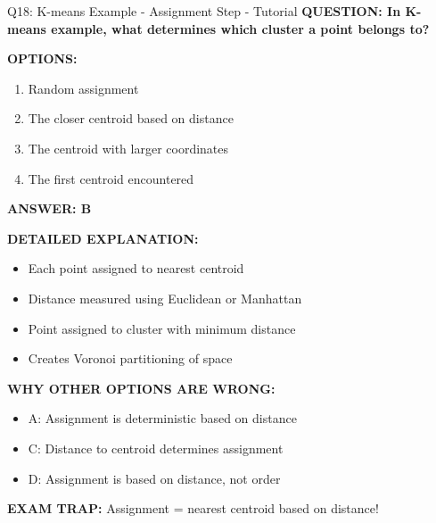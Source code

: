 \documentclass[8pt]{beamer}
\begin{document}
	\begin{frame}{Q18: K-means Example - Assignment Step - Tutorial}
		\fontsize{6.5}{7.5}\selectfont
		\textbf{QUESTION: In K-means example, what determines which cluster a point belongs to?}
		
		\vspace{0.1cm}
		\textbf{OPTIONS:}
		\begin{enumerate}
			\item Random assignment
			\item The closer centroid based on distance
			\item The centroid with larger coordinates
			\item The first centroid encountered
		\end{enumerate}
		
		\vspace{0.1cm}
		\textcolor{myblue}{\textbf{ANSWER: B}}
		
		\vspace{0.1cm}
		\textbf{DETAILED EXPLANATION:}
		\begin{itemize}
			\item Each point assigned to nearest centroid
			\item Distance measured using Euclidean or Manhattan
			\item Point assigned to cluster with minimum distance
			\item Creates Voronoi partitioning of space
		\end{itemize}
		
		\vspace{0.1cm}
		\textcolor{myred}{\textbf{WHY OTHER OPTIONS ARE WRONG:}}
		\begin{itemize}
			\item \textcolor{myred}{A:} Assignment is deterministic based on distance
			\item \textcolor{myred}{C:} Distance to centroid determines assignment
			\item \textcolor{myred}{D:} Assignment is based on distance, not order
		\end{itemize}
		
		\textcolor{myred}{\textbf{EXAM TRAP:}} Assignment = \textcolor{myblue}{nearest centroid} based on distance!
	\end{frame}
	
\end{document}
